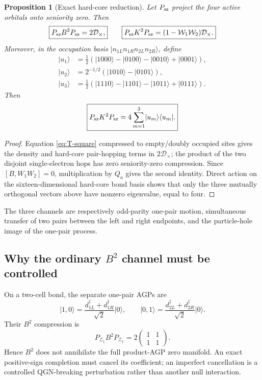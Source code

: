 \documentclass[11pt]{article}
\newtheorem{proposition}[theorem]{Proposition}
\theoremstyle{definition}
\theoremstyle{remark}
\newcommand{\cZ}{\mathcal Z}
\newcommand{\ket}[1]{\lvert #1\rangle}
\newcommand{\bra}[1]{\langle #1\rvert}
\begin{document}
\begin{proposition}[Exact hard-core reduction]
\label{prop:hardcore-reduction}
Let $P_{\rm sz}$ project the four active orbitals onto seniority zero.  Then
\begin{equation}
 \boxed{P_{\rm sz}B^2P_{\rm sz}=2\mathcal D_\times,}
 \qquad
 \boxed{P_{\rm sz}K^2P_{\rm sz}=(1-\mathcal W_1\mathcal W_2)\mathcal D_\times.}
 \label{eq:hardcore-reduction}
\end{equation}
Moreover, in the occupation basis $\ket{n_{1L}n_{1R}n_{2L}n_{2R}}$, define
\begin{align}
 \ket{u_1}&=\tfrac12(\ket{1000}-\ket{0100}-\ket{0010}+\ket{0001}),\\
 \ket{u_2}&=2^{-1/2}(\ket{1010}-\ket{0101}),\\
 \ket{u_3}&=\tfrac12(\ket{1110}-\ket{1101}-\ket{1011}+\ket{0111}).
\end{align}
Then
\begin{equation}
 \boxed{P_{\rm sz}K^2P_{\rm sz}=4\sum_{m=1}^{3}\ket{u_m}\bra{u_m}.}
 \label{eq:rank-three}
\end{equation}
\end{proposition}

\begin{proof}
Equation \eqref{eq:T-square} compressed to empty/doubly occupied sites gives the density and hard-core pair-hopping terms in $2\mathcal D_\times$; the product of the two disjoint single-electron hops has zero seniority-zero compression.  Since $[B,W_1W_2]=0$, multiplication by $Q_a$ gives the second identity.  Direct action on the sixteen-dimensional hard-core bond basis shows that only the three mutually orthogonal vectors above have nonzero eigenvalue, equal to four.
\end{proof}

The three channels are respectively odd-parity one-pair motion, simultaneous transfer of two pairs between the left and right endpoints, and the particle-hole image of the one-pair process.

\subsection{Why the ordinary \texorpdfstring{$B^2$}{B-squared} channel must be controlled}

On a two-cell bond, the separate one-pair AGPs are
\begin{equation}
 \ket{1,0}=\frac{d_{1L}^\dagger+d_{1R}^\dagger}{\sqrt2}\ket0,
 \qquad
 \ket{0,1}=\frac{d_{2L}^\dagger+d_{2R}^\dagger}{\sqrt2}\ket0.
\end{equation}
Their $B^2$ compression is
\begin{equation}
 \boxed{P_{\cZ_1}B^2P_{\cZ_1}=2
 \begin{pmatrix}1&1\\1&1\end{pmatrix}.}
 \label{eq:B2-compression}
\end{equation}
Hence $B^2$ does not annihilate the full product-AGP zero manifold.  An exact positive-sign completion must cancel its coefficient; an imperfect cancellation is a controlled QGN-breaking perturbation rather than another null interaction.
\end{document}
